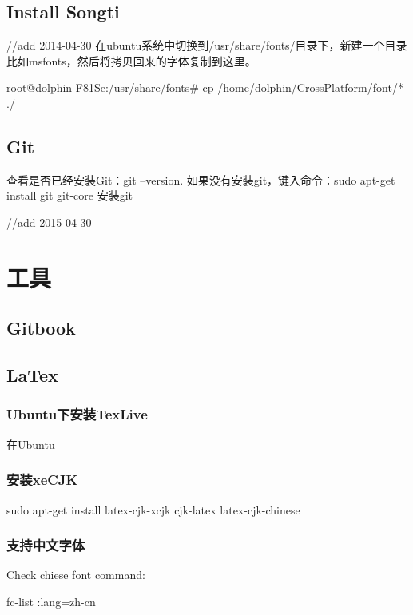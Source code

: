 \documentclass{book}
\begin{document}
\subsection{Install Songti}	

//add 2014-04-30	
在ubuntu系统中切换到/usr/share/fonts/目录下，新建一个目录比如msfonts，然后将拷贝回来的字体复制到这里。	

root@dolphin-F81Se:/usr/share/fonts\# cp /home/dolphin/CrossPlatform/font/* ./

\subsection{Git}

查看是否已经安装Git：git --version.
如果没有安装git，键入命令：sudo apt-get install git git-core 安装git


//add 2015-04-30	



\section{工具}	

\subsection{Gitbook}



\subsection{LaTex}

\subsubsection{Ubuntu下安装TexLive}	

在Ubuntu	

\subsubsection{安装xeCJK}

sudo apt-get install latex-cjk-xcjk cjk-latex latex-cjk-chinese

\subsubsection{支持中文字体}

Check chiese font command:

fc-list :lang=zh-cn	
\end{document}

